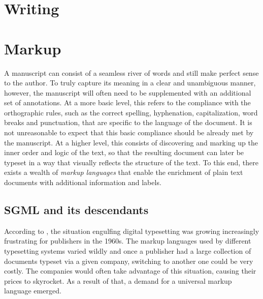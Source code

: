 \documentclass{book}
\begin{document}
    \chapter{Writing}

    \chapter{Markup}
      A manuscript can consist of a seamless river of words and still make
      perfect sense to the author. To truly capture its meaning in a clear and
      unambiguous manner, however, the manuscript will often need to be
      supplemented with an additional set of annotations. At a more basic level,
      this refers to the compliance with the orthographic rules, such as the
      correct spelling, hyphenation, capitalization, word breaks and
      punctuation, that are specific to the language of the document. It is not
      unreasonable to expect that this basic compliance should be already met by
      the manuscript. At a higher level, this consists of discovering and
      marking up the inner order and logic of the text, so that the resulting
      document can later be typeset in a way that visually reflects the
      structure of the text. To this end, there exists a wealth of \emph{markup
      languages} that enable the enrichment of plain text documents with
      additional information and labels.

      \section{SGML and its descendants}
        According to \cite{hlava11}, the situation engulfing digital typesetting
        was growing increasingly frustrating for publishers in the 1960s. The
        markup languages used by different typesetting systems varied wildly and
        once a publisher had a large collection of documents typeset via a given
        company, switching to another one could be very costly. The companies
        would often take advantage of this situation, causing their prices to
        skyrocket. As a result of that, a demand for a universal markup language
        emerged.
\end{document}

